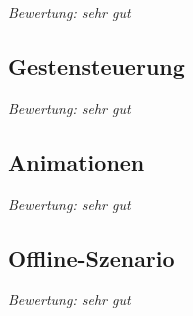 \vspace{5mm}
\emph{Bewertung: sehr gut}
\vspace{5mm}

\subsection{Gestensteuerung}

\vspace{5mm}
\emph{Bewertung: sehr gut}
\vspace{5mm}

\subsection{Animationen}

\vspace{5mm}
\emph{Bewertung: sehr gut}
\vspace{5mm}

\subsection{Offline-Szenario}

\vspace{5mm}
\emph{Bewertung: sehr gut}
\vspace{5mm}

